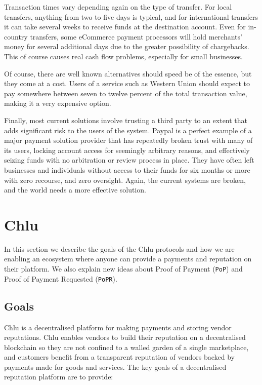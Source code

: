 \documentclass[a4paper]{article}
\begin{document}
Transaction times vary depending again on the type of transfer. For
local transfers, anything from two to five days is typical, and for
international transfers it can take several weeks​ to receive funds at
the destination account. Even for in-country transfers, some eCommerce
payment processors will hold merchants' money for several additional
days due to the greater possibility of chargebacks. This of course
causes real cash flow problems, especially for small businesses.

Of course, there are well known alternatives should speed be of the
essence, but they come at a cost. Users of a service such as Western
Union should expect to pay somewhere between seven to twelve percent
of the total transaction value, making it a very expensive option.

Finally, most current solutions involve trusting a third party to an
extent that adds significant risk to the users of the system. Paypal
is a perfect example of a major payment solution provider that has
repeatedly broken trust with many of its users, locking account access
for seemingly arbitrary reasons, and effectively seizing funds with no
arbitration or review process in place. They have often left
businesses and individuals without access to their funds for six
months or more with zero recourse, and zero oversight. Again, the
current systems are broken, and the world needs a more effective
solution.

\section{Chlu}

In this section we describe the goals of the Chlu protocols and how we
are enabling an ecosystem where anyone can provide a payments and
reputation on their platform. We also explain new ideas about Proof of
Payment (\texttt{PoP}) and Proof of Payment Requested (\texttt{PoPR}).

\subsection{Goals}

Chlu is a decentralised platform for making payments and storing
vendor reputations. Chlu enables vendors to build their reputation on
a decentralised blockchain so they are not confined to a walled garden
of a single marketplace, and customers benefit from a transparent
reputation of vendors backed by payments made for goods and
services. The key goals of a decentralised reputation platform are to
provide:
\end{document}
